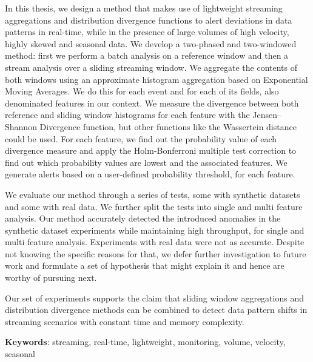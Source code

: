 In this thesis, we design a method that makes use of lightweight streaming aggregations and distribution divergence functions to alert deviations in data patterns in real-time, while in the presence of large volumes of high velocity, highly skewed and seasonal data. We develop a two-phased and two-windowed method: first we perform a batch analysis on a reference window and then a stream analysis over a sliding streaming window. We aggregate the contents of both windows using an approximate histogram aggregation based on Exponential Moving Averages. We do this for each event and for each of its fields, also denominated features in our context. We measure the divergence between both reference and sliding window histograms for each feature with the Jensen–Shannon Divergence function, but other functions like the Wassertein distance could be used. For each feature, we find out the probability value of each divergence measure and apply the Holm-Bonferroni multiple test correction to find out which probability values are lowest and the associated features. We generate alerts based on a user-defined probability threshold, for each feature.

We evaluate our method through a series of tests, some with synthetic datasets and some with real data. We further split the tests into single and multi feature analysis. Our method accurately detected the introduced anomalies in the synthetic dataset experiments while maintaining high throughput, for single and multi feature analysis. Experiments with real data were not as accurate. Despite not knowing the specific reasons for that, we defer further investigation to future work and formulate a set of hypothesis that might explain it and hence are worthy of pursuing next.

Our set of experiments supports the claim that sliding window aggregations and distribution divergence methods can be combined to detect data pattern shifts in streaming scenarios with constant time and memory complexity.

\vspace*{10mm}\noindent
\textbf{Keywords}: streaming, real-time, lightweight, monitoring, volume, velocity, seasonal

